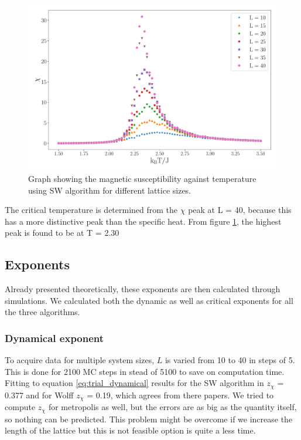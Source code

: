 \documentclass[a4paper,8pt]{article}
\begin{document}
\begin{figure}[htbp]
    \centering
    \includegraphics[scale = 0.4]{triple_2000_chi.pdf}
    \caption{Graph showing the magnetic susceptibility against temperature using SW algorithm for different lattice sizes.}
    \label{fig:magnetic sus}
\end{figure}


The critical temperature is determined from the $\chi$ peak at L = 40, because this has a more distinctive peak than the specific heat. From figure \ref{fig:magnetic sus}, the highest peak is found to be at T = 2.30

\subsection{Exponents}
Already presented theoretically, these exponents are then calculated through simulations. We calculated both the dynamic as well as critical exponents for all the three algorithms.

\subsubsection{Dynamical exponent}
To acquire data for multiple system sizes, $L$ is varied from 10 to 40 in steps of 5. This is done for
2100 MC steps in stead of 5100 to save on computation time. Fitting to equation \ref{eq:trial_dynamical} results for the SW algorithm in $z_{\chi}$ = 0.377 and for Wolff  $z_{\chi}$ = 0.19, which agrees from there papers.\supercite{Wolff_algo}\supercite{SW} We tried to compute  $z_{\chi}$ for metropolis as well, but the errors are as big as the quantity itself, so nothing can be predicted. This problem might be overcome if we increase the length of the lattice but this is not feasible option is quite a less time.
\end{document}
